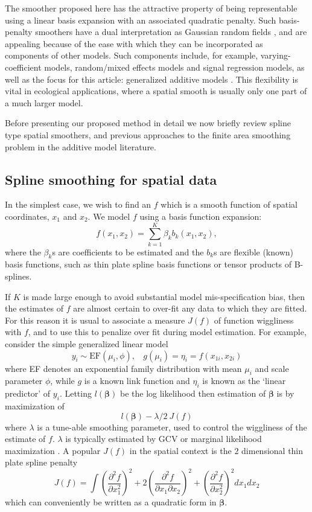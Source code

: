 \documentclass[smallextended]{svjour3}       %
\newcommand{\pdif}[2]{\frac{\partial #1}{\partial #2}}
\newcommand{\pddif}[3]{\frac{\partial^2 #1}{\partial #2 \partial #3}}
\begin{document}
The smoother proposed here has the attractive property of being representable using a linear basis expansion with an associated quadratic penalty. Such basis-penalty smoothers have a dual interpretation as Gaussian random fields \citep{rue2005gaussian}, and are appealing because of the ease with which they can be incorporated as components of other models. Such components include, for example, varying-coefficient models, random/mixed effects models and signal regression models, as well as the focus for this article: generalized additive models \citep[see e.g.][for overviews]{ruppert2003semiparametric, Wood:2006wz}. This flexibility is vital in ecological applications, where a spatial smooth is usually only one part of a much larger model.

Before presenting our proposed method in detail we now briefly review spline type spatial smoothers, and previous approaches to the finite area smoothing problem in the additive model literature.

\subsection{Spline smoothing for spatial data}

In the simplest case, we wish to find an $f$ which is a smooth function of spatial coordinates, $x_1$ and $x_2$. We model $f$ using a basis function expansion:
\begin{equation}
f(x_{1}, x_{2}) = \sum_{k=1}^K \beta_k b_k(x_{1}, x_{2}),
\label{basis-exp}
\end{equation}
where the $\beta_k$s are coefficients to be estimated and the $b_k$s are flexible (known) basis functions, such as thin plate spline basis functions or tensor products of B-splines. 

If $K$ is made large enough to avoid substantial model mis-specification bias, then the estimates of $f$ are almost certain to over-fit any data to which they are fitted. For this reason it is usual to associate a measure $J(f)$ of function wiggliness with $f$, and to use this to penalize over fit during model estimation. 
For example, consider the simple generalized linear model  
$$
y_i \sim \text{EF}(\mu_i, \phi),~~~~ g(\mu_i) = \eta_i =f(x_{1i},x_{2i})
$$
where EF denotes an exponential family distribution with mean $\mu_i$ and scale parameter $\phi$, while $g$ is a known link function and $\eta_i$ is known as the `linear predictor' of $y_i$. Letting $l({\bm \beta})$ be the log likelihood then estimation of $\bm \beta$ is by maximization of 
$$
l({\bm \beta}) - \lambda/2~J(f)
$$ 
where $\lambda$ is a tune-able smoothing parameter, used to control the wiggliness of the estimate of $f$. $\lambda $ is typically estimated by GCV or marginal likelihood maximization \citep{Wood:ub}. A popular $J(f)$ in the spatial context is the 2 dimensional thin plate spline penalty
$$
J(f) = \int \left (\pdif{^2 f}{x_1^2}\right )^2 + 2\left ( \pddif{f}{x_1}{x_2}\right )^2 + \left (\pdif{^2 f}{x_2^2}\right )^2 dx_1 dx_2
$$
which can conveniently be written as a quadratic form in $\bm \beta$. 
\end{document}
